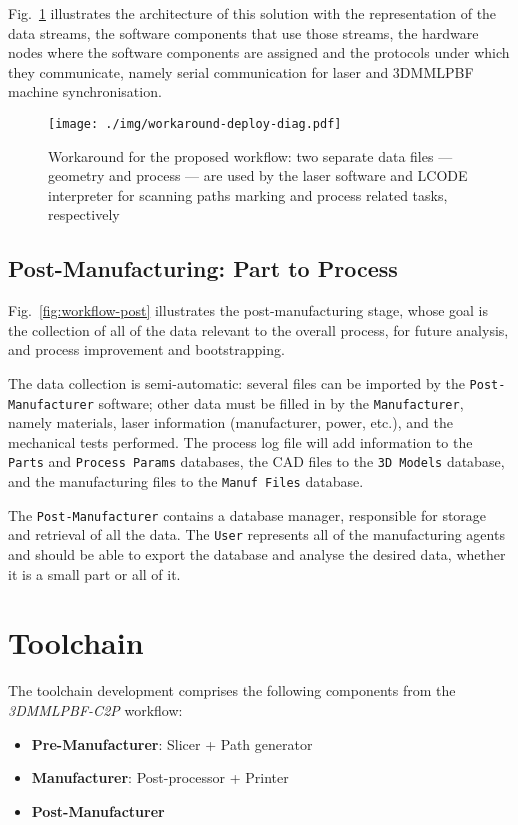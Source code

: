 Fig.~\ref{fig:workaround_deploy_diag} illustrates the architecture of this
solution with the representation of the data streams, the software components
that use those streams, the hardware nodes where the software components are
assigned and the protocols under which they communicate, namely serial
communication for laser and 3DMMLPBF machine synchronisation. 

\begin{figure}[!hbt]
  \centering
  \texttt{[image: ./img/workaround-deploy-diag.pdf]}
  \caption[Workflow for the proposed workflow]{Workaround for the proposed workflow: two separate data files ---
    geometry and process --- are used by the laser software and LCODE
    interpreter for scanning paths marking and process related tasks,
    respectively}%
  \label{fig:workaround_deploy_diag}
\end{figure}%
%

\subsection{Post-Manufacturing: Part to Process}%
\label{sec:post-manuf-part}
Fig.~\ref{fig:workflow-post} illustrates the post-manufacturing stage, whose
goal is the collection of all of the data relevant to the overall process, for
future analysis, and process improvement and bootstrapping.

The data collection is semi-automatic: several files can be imported by the
\texttt{Post-Manufacturer} software; other data must be filled in by the
\texttt{Manufacturer}, namely materials, laser information (manufacturer, power,
etc.), and the mechanical tests performed. The process log file will add information to the \texttt{Parts} and
\texttt{Process Params} databases, the CAD files to the \texttt{3D Models}
database, and the manufacturing files to the \texttt{Manuf Files} database.

The \texttt{Post-Manufacturer} contains a database manager, responsible for
storage and retrieval of all the data. The \texttt{User} represents all of the
manufacturing agents and should be able to export the database and analyse the
desired data, whether it is a small part or all of it.
%
\section{Toolchain}%
\label{sec:toolchain}
The toolchain development comprises the following components from the
\emph{3DMMLPBF-C2P} workflow:
\begin{itemize}
\item \textbf{Pre-Manufacturer}: Slicer + Path generator
\item \textbf{Manufacturer}: Post-processor + Printer
\item \textbf{Post-Manufacturer}
\end{itemize}

